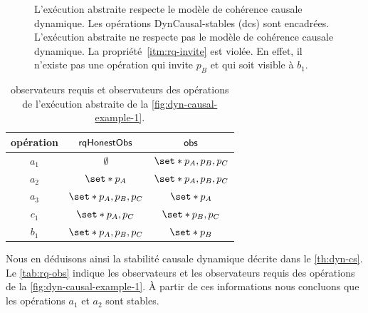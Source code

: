 \begin{figure}[htb]
\begin{subfigure}{\linewidth}
    \caption{}\label{fig:dyn-causal-example-2}
\end{subfigure}
\caption[Stabilité causale dynamique]{L'exécution abstraite  respecte le modèle de cohérence causale dynamique.
Les opérations DynCausal-stables (dcs) sont encadrées.
L'exécution abstraite  ne respecte pas le modèle de cohérence causale dynamique.
La propriété~\ref{itm:rq-invite} est violée.
En effet, il n'existe pas une opération qui invite $p_B$ et qui soit visible à $b_1$.}\label{fig:dyn-causal-example}
\end{figure}

\vspace{5em}

\begin{table}[h!]
    \centering
    \begin{tabular}{ccc}
        opération & $\operatorname{\mathsf{rqHonestObs}}$ & $\operatorname{\mathsf{obs}}$ \\
        \toprule
        $a_1$ & $\emptyset$ & $\set*{p_A, p_B, p_C}$ \\
        $a_2$ & $\set*{p_A}$ & $\set*{p_A, p_B, p_C}$ \\
        $a_3$ & $\set*{p_A, p_B, p_C}$ & $\set*{p_A}$ \\
        $c_1$ & $\set*{p_A, p_C}$ & $\set*{p_B, p_C}$\\
        $b_1$ & $\set*{p_A, p_B, p_C}$ & $\set*{p_B}$ \\
    \end{tabular}
    \caption[Observateurs requis]{observateurs requis et observateurs des opérations de l'exécution abstraite de la \autoref{fig:dyn-causal-example-1}.}\label{tab:rq-obs}
\end{table}

\clearpage

Nous en déduisons ainsi la stabilité causale dynamique décrite dans le \autoref{th:dyn-cs}.
Le \autoref{tab:rq-obs} indique les observateurs et les observateurs requis des opérations de la \autoref{fig:dyn-causal-example-1}.
À partir de ces informations nous concluons que les opérations $a_1$ et $a_2$ sont stables.

